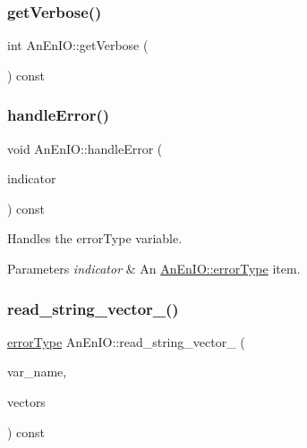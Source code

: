 \subsubsection{\texorpdfstring{get\+Verbose()}{getVerbose()}}
{\footnotesize\ttfamily int An\+En\+I\+O\+::get\+Verbose (\begin{DoxyParamCaption}{ }\end{DoxyParamCaption}) const}

\mbox{\label{class_an_en_i_o_a92276aeba9c0b5bd1cd3d285271d505f}} 
\subsubsection{\texorpdfstring{handle\+Error()}{handleError()}}
{\footnotesize\ttfamily void An\+En\+I\+O\+::handle\+Error (\begin{DoxyParamCaption}\item[{const \mbox{\hyperlink{class_an_en_i_o_aa56bc1ec6610b86db4349bce20f9ead0}{error\+Type}} \&}]{indicator }\end{DoxyParamCaption}) const}

Handles the error\+Type variable.


\begin{DoxyParams}{Parameters}
{\em indicator} & An \mbox{\hyperlink{class_an_en_i_o_aa56bc1ec6610b86db4349bce20f9ead0}{An\+En\+I\+O\+::error\+Type}} item. \\
\hline
\end{DoxyParams}
\mbox{\label{class_an_en_i_o_a17e7a4c520675c23b01cbd65c7ffe1d5}} 
\subsubsection{\texorpdfstring{read\+\_\+string\+\_\+vector\+\_\+()}{read\_string\_vector\_()}}
{\footnotesize\ttfamily \mbox{\hyperlink{class_an_en_i_o_aa56bc1ec6610b86db4349bce20f9ead0}{error\+Type}} An\+En\+I\+O\+::read\+\_\+string\+\_\+vector\+\_\+ (\begin{DoxyParamCaption}\item[{std\+::string}]{var\+\_\+name,  }\item[{std\+::vector$<$ std\+::string $>$ \&}]{vectors }\end{DoxyParamCaption}) const\hspace{0.3cm}{\ttfamily [protected]}}

